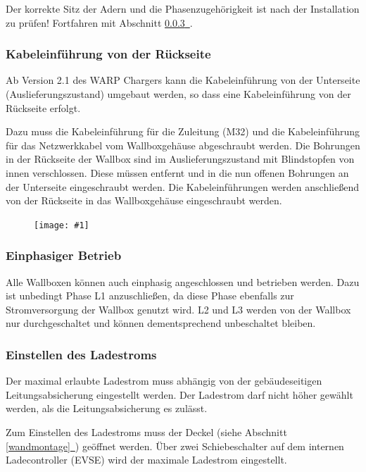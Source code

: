 \documentclass[a4paper,10pt]{article}
\newcommand{\gfx}[1]{\texttt{[image: \#1]}}
\newcommand*{\fullref}[1]{Abschnitt \hyperref[{#1}]{\ref*{#1}~\nameref*{#1}}}
\begin{document}
\begin{multicols*}{2}
    Der korrekte Sitz der Adern und die Phasenzugehörigkeit ist nach der
    Installation zu prüfen! Fortfahren mit \fullref{ladestrom_schalter}.

    \subsubsection{Kabeleinführung von der Rückseite}
    Ab Version 2.1 des WARP Chargers kann die Kabel\-einführung von der Unterseite
    (Auslieferungszustand) umgebaut werden, so dass eine Kabeleinführung von der
    Rückseite erfolgt.

    Dazu muss die Kabeleinführung für die Zuleitung (M32) und die
    Kabeleinführung für das Netzwerkkabel vom Wallboxgehäuse abgeschraubt
    werden. Die Bohrungen in der Rückseite der Wallbox sind im
    Auslieferungszustand mit Blindstopfen von innen verschlossen.
    Diese müssen entfernt und in die nun offenen Bohrungen an der Unterseite
    eingeschraubt werden. Die Kabeleinführungen werden anschließend von
    der Rückseite in das Wallboxgehäuse eingeschraubt werden.

    \begin{figure}[H]
        \gfx{./img_warp2/resized/warp2_1_back_wp_ready_1000.jpg}
    \end{figure}

    \subsubsection{Einphasiger Betrieb}
    Alle Wallboxen können auch einphasig angeschlossen und betrieben werden.
    Dazu ist unbedingt Phase L1 anzuschließen, da diese Phase ebenfalls zur
    Stromversorgung der Wallbox genutzt wird. L2 und L3 werden von der Wallbox
    nur durchgeschaltet und können dementsprechend unbeschaltet bleiben.

    \subsubsection{Einstellen des Ladestroms}\label{ladestrom_schalter}
    Der maximal erlaubte Ladestrom muss abhängig von der gebäudeseitigen
    Leitungsabsicherung eingestellt werden. Der Ladestrom darf nicht höher gewählt
    werden, als die Leitungsabsicherung es zulässt.

    Zum Einstellen des Ladestroms muss der Deckel (siehe \fullref{wandmontage})
    geöffnet werden. Über zwei Schiebeschalter auf dem internen Ladecontroller (EVSE) wird der
    maximale Ladestrom eingestellt.


\end{multicols*}
\end{document}
